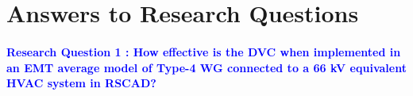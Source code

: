 



\section{Answers to Research Questions}
\vspace{2mm}
\paragraph{\textcolor{blue}{Research Question 1 : How effective is the \gls{DVC} when implemented in an \gls{EMT} average model of Type-4 \gls{WG} connected to a 66 kV equivalent \gls{HVAC} system in RSCAD?}}

